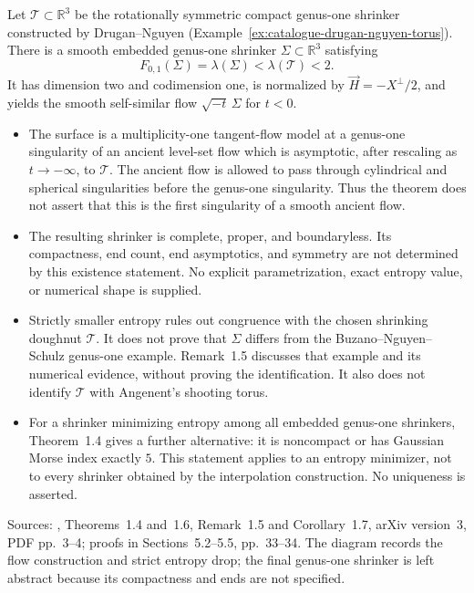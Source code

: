 \begin{example}\label{ex:catalogue-chu-sun-genus-one}
Let $\mathcal T\subset\mathbb R^3$ be the rotationally symmetric
compact genus-one shrinker constructed by Drugan--Nguyen
(Example~\ref{ex:catalogue-drugan-nguyen-torus}). There is a smooth
embedded genus-one shrinker $\Sigma\subset\mathbb R^3$ satisfying
\[
 F_{0,1}(\Sigma)=\lambda(\Sigma)
 <\lambda(\mathcal T)<2.
\]
It has dimension two and codimension one, is normalized by
$\vec H=-X^\perp/2$, and yields the smooth self-similar flow
$\sqrt{-t}\,\Sigma$ for $t<0$.
\begin{itemize}
\item The surface is a multiplicity-one tangent-flow model at a
genus-one singularity of an ancient level-set flow which is
asymptotic, after rescaling as $t\to-\infty$, to $\mathcal T$.
The ancient flow is allowed to pass through cylindrical and spherical
singularities before the genus-one singularity. Thus the theorem does
not assert that this is the first singularity of a smooth ancient flow.
\item The resulting shrinker is complete, proper, and boundaryless.
Its compactness, end count, end asymptotics, and symmetry are not
determined by this existence statement. No explicit parametrization,
exact entropy value, or numerical shape is supplied.
\item Strictly smaller entropy rules out congruence with the chosen
shrinking doughnut $\mathcal T$. It does not prove that $\Sigma$
differs from the Buzano--Nguyen--Schulz genus-one example.
Remark~1.5 discusses that example and its numerical evidence,
without proving the identification. It also does not identify
$\mathcal T$ with Angenent's shooting torus.
\item For a shrinker minimizing entropy among all embedded genus-one
shrinkers, Theorem~1.4 gives a further alternative: it is noncompact
or has Gaussian Morse index exactly $5$. This statement applies to
an entropy minimizer, not to every shrinker obtained by the
interpolation construction. No uniqueness is asserted.
\end{itemize}
Sources: \cite{CatChuSun2025}, Theorems~1.4 and~1.6,
Remark~1.5 and Corollary~1.7, arXiv version~3, PDF pp.~3--4;
proofs in Sections~5.2--5.5, pp.~33--34.
The diagram records the flow construction and strict entropy drop;
the final genus-one shrinker is left abstract because its compactness
and ends are not specified.
\end{example}

